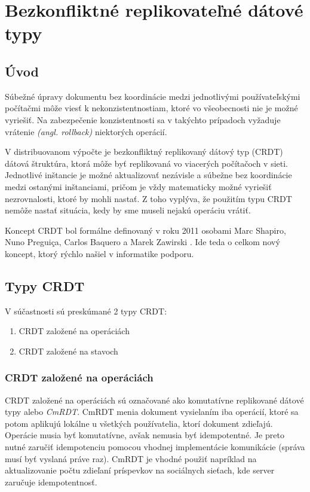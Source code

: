 \chapter{Bezkonfliktné replikovateľné dátové typy}

\label{kap:cdrt} %

\section{Úvod}

Súbežné úpravy dokumentu bez koordinácie medzi jednotlivými používateľskými počítačmi môže viesť k
nekonzistentnostiam, ktoré vo všeobecnosti nie je možné vyriešiť. Na zabezpečenie konzistentnosti sa
v takýchto prípadoch vyžaduje vrátenie \textit{(angl. rollback)} niektorých operácií.

V distribuovanom výpočte je bezkonfliktný replikovaný dátový typ (CRDT) dátová štruktúra,
ktorá môže byť replikovaná vo viacerých počítačoch v sieti. Jednotlivé inštancie je možné
aktualizovať nezávisle a súbežne bez koordinácie medzi ostanými inštanciami, pričom je vždy
matematicky možné vyriešiť nezrovnalosti, ktoré by mohli nastať. Z toho vyplýva, že použitím typu
CRDT nemôže nastať situácia, kedy by sme museli nejakú operáciu vrátiť. 

Koncept CRDT bol formálne definovaný v roku 2011 osobami
Marc Shapiro, Nuno Preguiça, Carlos Baquero a Marek Zawirski \cite{crdt_definition}.
Ide teda o celkom nový koncept, ktorý rýchlo našiel v informatike podporu.

\section{Typy CRDT}
V súčastnosti sú preskúmané 2 typy CRDT:
\begin{enumerate}
  \item CRDT založené na operáciách
  \item CRDT založené na stavoch
\end{enumerate}

\subsection{CRDT založené na operáciách}
CRDT založené na operáciách sú označované ako komutatívne replikované dátové typy alebo 
\textit{CmRDT}. CmRDT menia dokument vysielaním iba operácií, ktoré sa potom aplikujú lokálne
u všetkých používatelia, ktorí dokument zdieľajú. Operácie musia byť komutatívne, avšak nemusia 
byť idempotentné. Je preto nutné zaručiť idempotenciu pomocou vhodnej implementácie
komunikácie (správa musí byť vyslaná práve raz). 
CmRDT je vhodné použiť napríklad na aktualizovanie počtu zdieľaní
príspevkov na sociálnych sieťach, kde server zaručuje idempotentnosť. 


